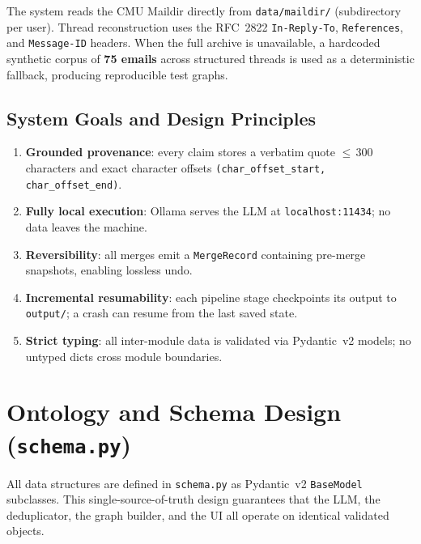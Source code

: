 \documentclass[12pt,a4paper]{article}
\begin{document}
\begin{tcolorbox}[title=Dataset Sourcing, colback=blue!5, colframe=keyblue, breakable]
The system reads the CMU Maildir directly from \texttt{data/maildir/} (subdirectory per user). Thread reconstruction uses the RFC~2822 \texttt{In-Reply-To}, \texttt{References}, and \texttt{Message-ID} headers. When the full archive is unavailable, a hardcoded synthetic corpus of \textbf{75 emails} across structured threads is used as a deterministic fallback, producing reproducible test graphs.
\end{tcolorbox}

\subsection{System Goals and Design Principles}

\begin{enumerate}[label=\textbf{G\arabic*.}]
    \item \textbf{Grounded provenance}: every claim stores a verbatim quote $\leq$\,300 characters and exact character offsets \texttt{(char\_offset\_start, char\_offset\_end)}.
    \item \textbf{Fully local execution}: Ollama serves the LLM at \texttt{localhost:11434}; no data leaves the machine.
    \item \textbf{Reversibility}: all merges emit a \texttt{MergeRecord} containing pre-merge snapshots, enabling lossless undo.
    \item \textbf{Incremental resumability}: each pipeline stage checkpoints its output to \texttt{output/}; a crash can resume from the last saved state.
    \item \textbf{Strict typing}: all inter-module data is validated via Pydantic~v2 models; no untyped dicts cross module boundaries.
\end{enumerate}

\section{Ontology and Schema Design (\texttt{schema.py})}

All data structures are defined in \texttt{schema.py} as Pydantic~v2 \texttt{BaseModel} subclasses. This single-source-of-truth design guarantees that the LLM, the deduplicator, the graph builder, and the UI all operate on identical validated objects.
\end{document}
